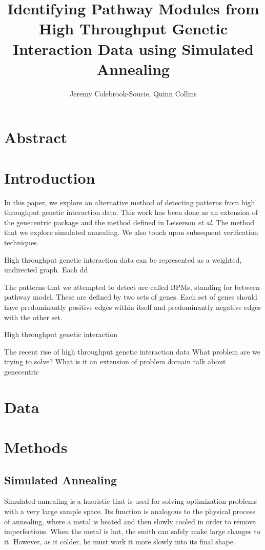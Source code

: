 \documentclass[11pt]{article}
\title{Identifying Pathway Modules from High Throughput Genetic Interaction Data using Simulated Annealing}
\author{Jeremy Colebrook-Soucie, Quinn Collins}
\begin{document}
\maketitle


\section{Abstract}


\section{Introduction}
\par In this paper, we explore an alternative method of detecting patterns from high throughput genetic interaction data. This work has been done as an extension of the genecentric package and the method defined in Leiserson \textit{et al}. The method that we explore simulated annealing. We also touch upon subsequent verification techniques.

\par High throughput genetic interaction data can be represented as a weighted, undirected graph. Each dd

\par The patterns that we attempted to detect are called BPMs, standing for between pathway model. These are defined by two sets of genes. Each set of genes should have predominantly positive edges within itself and predominantly negative edges with the other set. 


High throughput genetic interaction 

The recent rise of high throughput genetic interaction data 
What problem are we trying to solve?
What is it an extension of
problem domain
talk about genecentric
\section{Data}


\section{Methods}
\subsection{Simulated Annealing}
\par Simulated annealing is a hueristic that is used for solving optimization problems with a very large sample space. Its function is analogous to the physical process of annealing, where a metal is heated and then slowly cooled in order to remove imperfections. When the metal is hot, the smith can safely make large changes to it. However, as it colder, he must work it more slowly into its final shape. 
\end{document}

